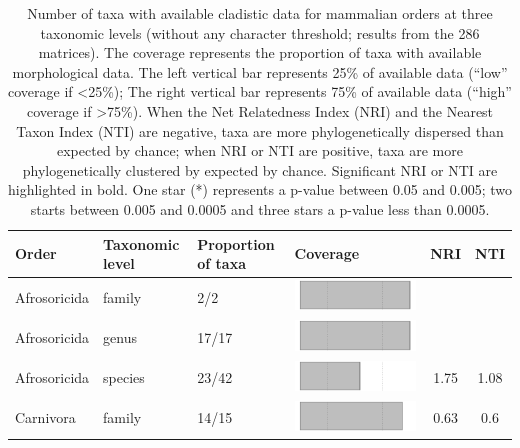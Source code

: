 \begin{longtable}{lL{1.8cm}C{2cm}lcc}
\caption[Number of taxa with available cladistic data for mammalian orders without any character threshold]{Number of taxa with available cladistic data for mammalian orders at three taxonomic levels (without any character threshold; results from the 286 matrices). The coverage represents the proportion of taxa with available morphological data. The left vertical bar represents 25\% of available data (``low'' coverage if \textless 25\%); The right vertical bar represents 75\% of available data (``high'' coverage if \textgreater 75\%). When the Net Relatedness Index (NRI) and the Nearest Taxon Index (NTI) are negative, taxa are more phylogenetically dispersed than expected by chance; when NRI or NTI are positive, taxa are more phylogenetically clustered by expected by chance. Significant NRI or NTI are highlighted in bold. One star (*) represents a p-value between 0.05 and 0.005; two starts between 0.005 and 0.0005 and three stars a p-value less than 0.0005.} \\ 
  \hline
Order & Taxonomic level & Proportion of taxa & Coverage & NRI & NTI \\ 
  \hline
Afrosoricida & family & 2/2 & \includegraphics[width=0.20\linewidth, height=0.05\linewidth]{Supplementaries/Figures/Chapter2/Results_1c/Table_figures/bar1.pdf} &   &   \\ 
  Afrosoricida & genus & 17/17 & \includegraphics[width=0.20\linewidth, height=0.05\linewidth]{Supplementaries/Figures/Chapter2/Results_1c/Table_figures/bar2.pdf} &   &   \\ 
  Afrosoricida & species & 23/42 & \includegraphics[width=0.20\linewidth, height=0.05\linewidth]{Supplementaries/Figures/Chapter2/Results_1c/Table_figures/bar3.pdf} & 1.75 & 1.08 \\ 
  Carnivora & family & 14/15 & \includegraphics[width=0.20\linewidth, height=0.05\linewidth]{Supplementaries/Figures/Chapter2/Results_1c/Table_figures/bar4.pdf} & 0.63 & 0.6 \\ 

\end{longtable}
